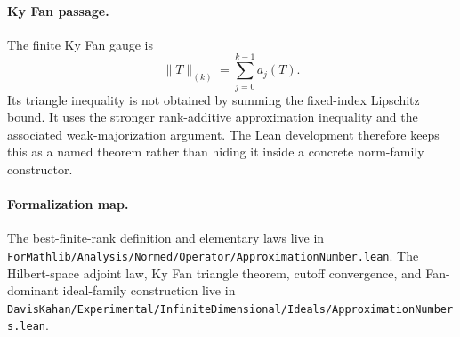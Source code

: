 \paragraph{Ky Fan passage.}
The finite Ky Fan gauge is
\[
  \lVert T\rVert_{(k)}=\sum_{j=0}^{k-1} a_j(T).
\]
Its triangle inequality is not obtained by summing the fixed-index Lipschitz
bound.  It uses the stronger rank-additive approximation inequality and the
associated weak-majorization argument.  The Lean development therefore keeps
this as a named theorem rather than hiding it inside a concrete norm-family
constructor.

\paragraph{Formalization map.}
The best-finite-rank definition and elementary laws live in
\texttt{ForMathlib/Analysis/Normed/Operator/ApproximationNumber.lean}.
The Hilbert-space adjoint law, Ky Fan triangle theorem, cutoff convergence, and
Fan-dominant ideal-family construction live in
\texttt{DavisKahan/Experimental/InfiniteDimensional/Ideals/ApproximationNumbers.lean}.
